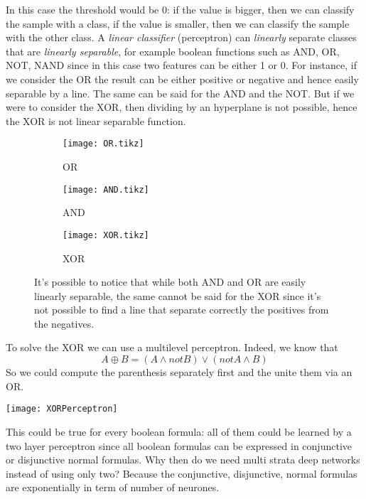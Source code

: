 In this case the threshold would be 0: if the value is bigger, then we can classify the sample with a class, if the value is smaller, then we can classify the sample with the other class. \newline
A \textit{linear classifier} (perceptron) can \textit{linearly} separate classes that are \textit{linearly separable}, for example boolean functions such as AND, OR, NOT, NAND since in this case two features can be either 1 or 0. For instance, if we consider the OR the result can be either positive or negative and hence easily separable by a line. The same can be said for the AND and the NOT. But if we were to consider the XOR, then dividing by an hyperplane is not possible, hence the XOR is not linear separable function.
\begin{center}
\begin{figure}[htp]
  \begin{subfigure}{0.31\linewidth}%
      \centering
      \texttt{[image: OR.tikz]}  
      \caption*{OR}
  \end{subfigure}
  \hspace{0.01\linewidth}
  \begin{subfigure}{0.31\linewidth}%
      \centering
      \texttt{[image: AND.tikz]}  
      \caption*{AND}
  \end{subfigure}
  \hspace{0.01\linewidth}
  \begin{subfigure}{0.31\linewidth}%
      \centering
      \texttt{[image: XOR.tikz]}  
      \caption*{XOR}
  \end{subfigure}
  \caption{It's possible to notice that while both AND and OR are easily linearly separable, the same cannot be said for the XOR since it's not possible to find a line that separate correctly the positives from the negatives.}
  \label{fig:BooleanPerceptron}
\end{figure}
\end{center}
To solve the XOR we can use a multilevel perceptron. Indeed, we know that 
\[A\oplus B=(A\wedge not B)\vee (not A\wedge B)\]
So we could compute the parenthesis separately first and the unite them via an OR. 
\begin{center}
  \texttt{[image: XORPerceptron]}
\end{center}
This could be true for every boolean formula: all of them could be learned by a two layer perceptron since all boolean formulas can be expressed in conjunctive or disjunctive normal formulas. Why then do we need multi strata deep networks instead of using only two? Because the conjunctive, disjunctive, normal formulas are exponentially in term of number of neurones. \newline
